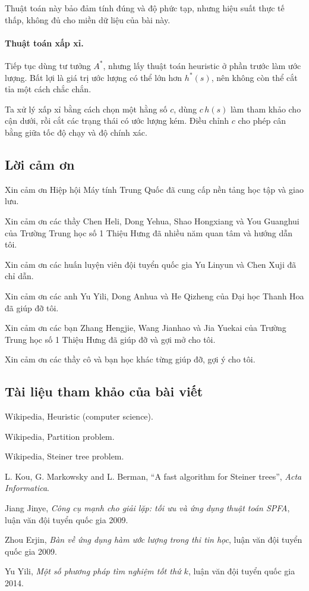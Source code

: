 \documentclass[11pt]{article}
\begin{document}
Thuật toán này bảo đảm tính đúng và độ phức tạp, nhưng hiệu suất thực tế thấp,
không đủ cho miền dữ liệu của bài này.

\paragraph{Thuật toán xấp xỉ.}
Tiếp tục dùng tư tưởng \(A^*\), nhưng lấy thuật toán heuristic ở phần trước làm
ước lượng. Bất lợi là giá trị ước lượng có thể lớn hơn \(h^*(s)\), nên không còn
thể cắt tỉa một cách chắc chắn.

Ta xử lý xấp xỉ bằng cách chọn một hằng số \(c\), dùng \(c\,h(s)\) làm tham khảo
cho cận dưới, rồi cắt các trạng thái có ước lượng kém. Điều chỉnh \(c\) cho phép
cân bằng giữa tốc độ chạy và độ chính xác.

\subsection{Lời cảm ơn}

Xin cảm ơn Hiệp hội Máy tính Trung Quốc đã cung cấp nền tảng học tập và giao
lưu.

Xin cảm ơn các thầy Chen Heli, Dong Yehua, Shao Hongxiang và You Guanghui của
Trường Trung học số 1 Thiệu Hưng đã nhiều năm quan tâm và hướng dẫn tôi.

Xin cảm ơn các huấn luyện viên đội tuyển quốc gia Yu Linyun và Chen Xuji đã chỉ
dẫn.

Xin cảm ơn các anh Yu Yili, Dong Anhua và He Qizheng của Đại học Thanh Hoa đã
giúp đỡ tôi.

Xin cảm ơn các bạn Zhang Hengjie, Wang Jianhao và Jia Yuekai của Trường Trung
học số 1 Thiệu Hưng đã giúp đỡ và gợi mở cho tôi.

Xin cảm ơn các thầy cô và bạn học khác từng giúp đỡ, gợi ý cho tôi.

\subsection*{Tài liệu tham khảo của bài viết}

\begin{enumerate}[label={[\arabic*]},leftmargin=3em]
  \item Wikipedia, Heuristic (computer science).
  \item Wikipedia, Partition problem.
  \item Wikipedia, Steiner tree problem.
  \item L. Kou, G. Markowsky and L. Berman, ``A fast algorithm for Steiner trees'', \emph{Acta Informatica}.
  \item Jiang Jinye, \emph{Công cụ mạnh cho giải lặp: tối ưu và ứng dụng thuật toán SPFA}, luận văn đội tuyển quốc gia 2009.
  \item Zhou Erjin, \emph{Bàn về ứng dụng hàm ước lượng trong thi tin học}, luận văn đội tuyển quốc gia 2009.
  \item Yu Yili, \emph{Một số phương pháp tìm nghiệm tốt thứ \(k\)}, luận văn đội tuyển quốc gia 2014.
\end{enumerate}
\end{document}

